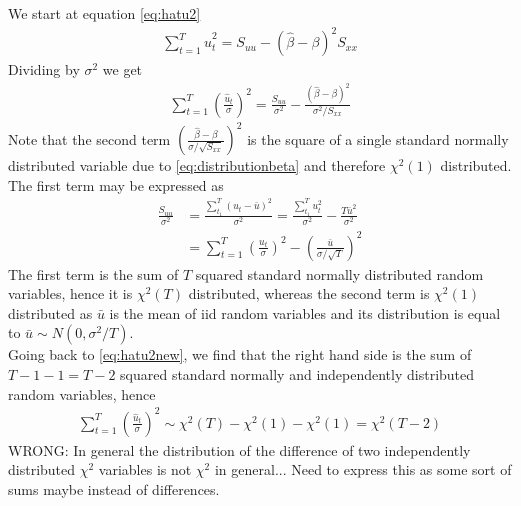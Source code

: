 \documentclass{article}
\begin{document}
We start at equation \eqref{eq:hatu2}
\begin{align}
\sum_{t=1}^{T}\hat{u}_t^2 = S_{uu} -(\hat{\beta}-\beta)^2 S_{xx} \label{eq:hatu2new}
\end{align}
Dividing by $\sigma^2$ we get
\begin{align}
\sum_{t=1}^{T}\left(\frac{\hat{u}_t}{\sigma}\right)^2 =   \frac{S_{uu}}{\sigma^2} -\frac{(\hat{\beta}-\beta)^2}{\sigma^2/S_{xx}}
\end{align}
Note that the second term $\left(\frac{\hat{\beta}-\beta}{\sigma/\sqrt{S_{xx}}}\right)^2$ is the square of a single standard normally distributed variable due to \eqref{eq:distributionbeta} and therefore $\chi^2(1)$ distributed. The first term may be expressed as
\begin{align}
\frac{S_{uu}}{\sigma^2} &= \frac{\sum_{t_1}^{T}(u_t-\bar{u})^2}{\sigma^2} = \frac{\sum_{t_1}^{T}u_t^2}{\sigma^2} - \frac{T\bar{u}^2}{\sigma^2}\\
&= \sum_{t=1}^{T}\left(\frac{u_t}{\sigma}\right)^2 - \left(\frac{\bar{u}}{\sigma/\sqrt{T}}\right)^2
\end{align}
The first term is the sum of $T$ squared standard normally distributed random variables, hence it is $\chi^2(T)$ distributed, whereas the second term is $\chi^2(1)$ distributed as $\bar{u}$ is the mean of iid random variables and its distribution is equal to $\bar{u}\sim N(0,\sigma^2/T)$.\\
Going back to \eqref{eq:hatu2new}, we find that the right hand side is the sum of $T-1-1 = T-2$ squared standard normally and independently distributed random variables, hence
\begin{align}
\sum_{t=1}^T \left(\frac{\hat{u}_t}{\sigma}\right)^2 \sim \chi^2(T)-\chi^2(1)-\chi^2(1) = \chi^2(T-2)
\end{align}
WRONG: In general the distribution of the difference of two independently distributed $\chi^2$ variables is not $\chi^2$ in general... Need to express this as some sort of sums maybe instead of differences.
\end{document}
